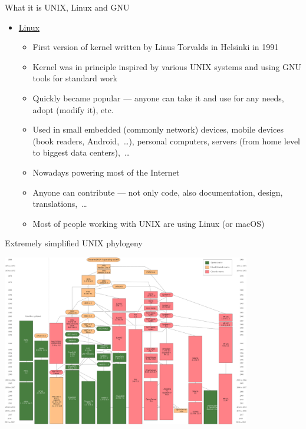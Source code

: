 \documentclass[compress, ucs, xelatex, 11pt, xcolor=svgnames, aspectratio=169,
	hyperref={
		bookmarks=true,
		unicode=true,
		colorlinks=true,
		pdftitle={Linux, command line and MetaCentrum},
		plainpages=false,
		pdfauthor={Vojtech Zeisek},
		pdfsubject={Course about use of Linux command line, writing shell scripts and using MetaCentrum of CESNET},
		pdfcreator={XeLaTeX},
		pdfkeywords={Linux, GNU, BASH, shell, command line, MetaCentrum},
		linkcolor=DarkRed, %
		anchorcolor=DarkBlue, %
		citecolor=Indigo, %
		filecolor=NavyBlue, %
		menucolor=DarkMagenta, %
		urlcolor=DarkBlue, %
		pdftex},
	url={hyphens, lowtilde} %
	]{beamer}
\begin{document}
\begin{frame}[allowframebreaks]{What it is UNIX, Linux and GNU}
\begin{itemize}
\begin{itemize}
			\item Since 1984 Richard Stallman (founder of \href{https://www.fsf.org/}{Free Software Foundation}) tried to make new kernel (Hurd --- not finished yet\ldots)
			\item Generally set of basic system tools --- working with many kernels (Linux, BSD*, macOS,~\ldots), also present in many commercial paid UNIX systems
			\item Source code is free and open --- anyone can study it (Security!), report bugs, contribute, modify, share it,~\ldots
			\item GNU General Public License (GPL) --- free spirit of open-source --- license, idea, how to share software
		\end{itemize}
		\item \href{https://en.wikipedia.org/wiki/Linux}{Linux}
		\begin{itemize}
			\item First version of kernel written by Linus Torvalds in Helsinki in 1991
			\item Kernel was in principle inspired by various UNIX systems and using GNU tools for standard work
			\item Quickly became popular --- anyone can take it and use for any needs, adopt (modify it), etc.
			\item Used in small embedded (commonly network) devices, mobile devices (book readers, Android,~\ldots), personal computers, servers (from home level to biggest data centers),~\ldots
			\item Nowadays powering most of the Internet
			\item Anyone can contribute --- not only code, also documentation, design, translations,~\ldots
			\item Most of people working with UNIX are using Linux (or macOS)
		\end{itemize}
	\end{itemize}
\end{frame}

\begin{frame}{Extremely simplified UNIX phylogeny}
	\begin{center}
		\includegraphics[height=7.5cm]{unix_history-simple.png}
	\end{center}
\end{frame}
\end{document}
